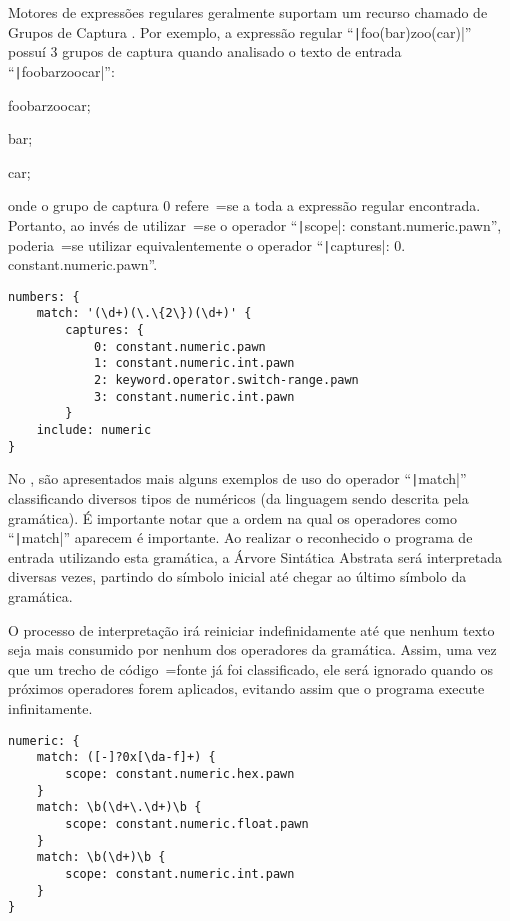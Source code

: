 Motores de expressões regulares geralmente suportam um recurso chamado de Grupos de Captura \cite{expressionGrammarsWithRegexLikeCaptures}.
Por exemplo,
a expressão regular ``\texttt|foo(bar)zoo(car)|'' possuí 3 grupos de captura quando analisado o texto de entrada ``\texttt|foobarzoocar|'':
\begin{inparaenum}[1)]\setcounter{enumi}{-1}
\item foobarzoocar;
\item bar;
\item car;
\end{inparaenum}%
onde o grupo de captura 0 refere~=se a toda a expressão regular encontrada.
Portanto,
ao invés de utilizar~=se o operador ``\texttt|scope|:
constant.numeric.pawn'',
poderia~=se utilizar equivalentemente o operador ``\texttt|captures|:
0.
constant.numeric.pawn''.
\begin{lstlisting}[caption={Exemplo de Gramática, Grupos de Captura},label={code:exemploDeGramaticaPawn3},style=yaml_style]
numbers: {
    match: '(\d+)(\.\{2\})(\d+)' {
        captures: {
            0: constant.numeric.pawn
            1: constant.numeric.int.pawn
            2: keyword.operator.switch-range.pawn
            3: constant.numeric.int.pawn
        }
    include: numeric
}
\end{lstlisting}

No ,
são apresentados mais alguns exemplos de uso do operador ``\texttt|match|'' classificando diversos tipos de numéricos (da linguagem sendo descrita pela gramática).
É importante notar que a ordem na qual os operadores como ``\texttt|match|'' aparecem é importante.
Ao realizar o reconhecido o programa de entrada utilizando esta gramática,
a Árvore Sintática Abstrata \cite{ahoCompilerDragonBook} será interpretada diversas vezes,
partindo do símbolo inicial até chegar ao último símbolo da gramática.

O processo de interpretação irá reiniciar indefinidamente até que nenhum texto seja mais consumido por nenhum dos operadores da gramática.
Assim,
uma vez que um trecho de código~=fonte já foi classificado,
ele será ignorado quando os próximos operadores forem aplicados,
evitando assim que o programa execute infinitamente.
\begin{lstlisting}[caption={Exemplo de Gramática, Tipos numéricos},label={code:exemploDeGramaticaPawn4},style=yaml_style]
numeric: {
    match: ([-]?0x[\da-f]+) {
        scope: constant.numeric.hex.pawn
    }
    match: \b(\d+\.\d+)\b {
        scope: constant.numeric.float.pawn
    }
    match: \b(\d+)\b {
        scope: constant.numeric.int.pawn
    }
}
\end{lstlisting}

